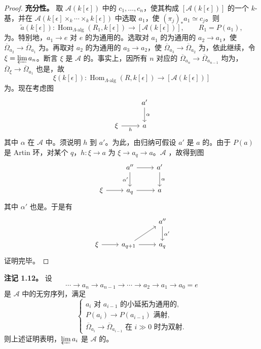 \begin{proof}
\textbf{充分性。} 取 $\mathcal A(k[\epsilon])$ 中的 $c_1,\ldots,c_n$，使其构成 $[\mathcal A(k[\epsilon])]$ 的一个 $k$-基，并在 $\mathcal A(k[\epsilon]\times_k\cdots\times_k k[\epsilon])$ 中选取 $a_1$，使 $(\pi_j)_*a_1\simeq c_j$。则
\[\widetilde a(k[\epsilon]):\operatorname{Hom}_{\Lambda\text{-alg}}(R_1,k[\epsilon])
\longrightarrow[\mathcal A(k[\epsilon])],\qquad R_1=P(a_1),\]
为。特别地，$a_1\to e$ 对 $e$ 的为通用的。选取对 $a_1$ 的为通用的 $a_2\to a_1$，使 $\overline\Omega_{a_2}\to\overline\Omega_{a_1}$ 为。再取对 $a_2$ 的为通用的 $a_3\to a_2$，使 $\overline\Omega_{a_3}\to\overline\Omega_{a_2}$ 为，依此继续，令 $\xi=\varprojlim a_n$。断言 $\xi$ 是 $\mathcal A$ 的。事实上，因所有 $n$ 对应的 $\overline\Omega_{a_n}\to\overline\Omega_{a_{n-1}}$ 均为，$\overline\Omega_\xi\to\overline\Omega_{a_1}$ 也是，故
\[\xi(k[\epsilon]):\operatorname{Hom}_{\Lambda\text{-alg}}(R,k[\epsilon])\to[\mathcal A(k[\epsilon])]\]
为。现在考虑图
\[\begin{tikzcd}&a'\arrow[d,"\alpha"]\\\xi\arrow[r,"h"']&a\end{tikzcd}\]
其中 $\alpha$ 在 $\mathcal A$ 中。须说明 $h$ 到 $a'$。为此，由归纳可假设 $a'$ 是 $a$ 的。由于 $P(a)$ 是 Artin 环，对某个 $q$，$h:\xi\to a$ 为 $\xi\to a_q\to a$。$\mathcal A$ ，故得到图
\[\begin{tikzcd}&a''\arrow[r]\arrow[d,"\alpha'"']&a'\arrow[d,"\alpha"]\\\xi\arrow[r]&a_q\arrow[r]&a\end{tikzcd}\]
其中 $\alpha'$ 也是。于是有
\[\begin{tikzcd}&&a''\arrow[d,"\alpha'"]\\\xi\arrow[r]&a_{q+1}\arrow[ur]\arrow[r]&a_q\end{tikzcd}\]
证明完毕。
\end{proof}
\textbf{注记 1.12。} 设
\[\cdots\longrightarrow a_n\longrightarrow a_{n-1}\longrightarrow\cdots
\longrightarrow a_2\longrightarrow a_1\longrightarrow a_0=e\]
是 $\mathcal A$ 中的无穷序列，满足
\[\begin{cases}
a_i\text{ 对 }a_{i-1}\text{ 的小延拓为通用的},\\
P(a_i)\longrightarrow P(a_{i-1})\text{ 满射},\\
\overline\Omega_{a_i}\longrightarrow\overline\Omega_{a_{i-1}}\text{ 在 }i\gg0\text{ 时为双射}.
\end{cases}\]
则上述证明表明，$\varprojlim a_i$ 是 $\mathcal A$ 的。

